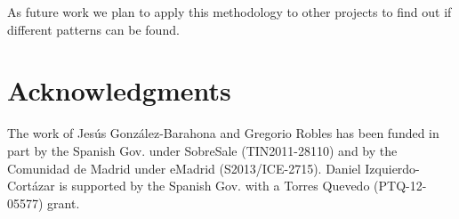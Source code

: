 \documentclass{sig-alternate-05-2015}
\begin{document}
As future work we plan to apply this methodology to other projects to find
out if different patterns can be found.

\section*{Acknowledgments}

The work of Jes\'us Gonz\'alez-Barahona and Gregorio Robles has been funded in part by the Spanish Gov. under SobreSale (TIN2011-28110) and by the Comunidad de Madrid under eMadrid (S2013/ICE-2715). Daniel Izquierdo-Cort\'azar is supported by the Spanish Gov. with a Torres Quevedo
 (PTQ-12-05577) grant.



%

%
%
\end{document}
